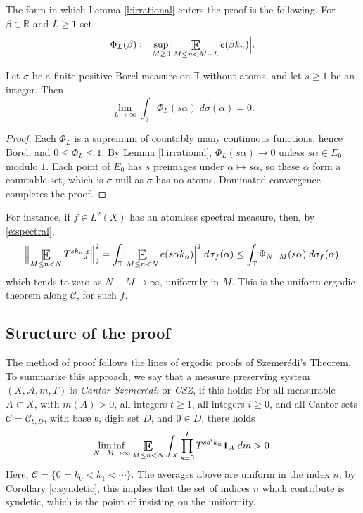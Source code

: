 The form in which Lemma \ref{l:irrational} enters the proof is the following.  For $\beta \in \mathbb R$ and $L \geq 1$ set 
\begin{equation} \label{e:Phi}
\Phi _L (\beta) \coloneqq \sup _{M\geq 0} \Bigl\lvert \Expectation_{M\leq n<M+L} e ( \beta k_n) \Bigr\rvert . 
\end{equation}

\begin{lemma} \label{l:uniformSpectral}
Let $\sigma$ be a finite positive Borel measure on $\mathbb T$ without atoms, and let $s \geq 1$ be an integer.  Then 
\begin{equation}
\lim_{L\to\infty} \int_{\mathbb T} \Phi _L (s \alpha ) \;d \sigma ( \alpha ) = 0 . 
\end{equation}
\end{lemma}

\begin{proof}
Each $\Phi_L$ is a supremum of countably many continuous functions, hence Borel, and $0 \leq \Phi _L \leq 1$.  
By Lemma \ref{l:irrational}, $\Phi_L(s \alpha ) \to 0$ unless $s \alpha \in E_0$ modulo $1$.  
Each point of $E_0$ has $s$ preimages under $\alpha \mapsto s\alpha$, so these $\alpha$ form a countable set, which is $\sigma$-null as $\sigma$ has no atoms.  
Dominated convergence completes the proof.  
\end{proof}

For instance, if $f \in L^2(X)$ has an atomless spectral measure, then, by \eqref{e:spectral}, 
\begin{equation} \label{e:Uniform}
\Bigl\lVert \Expectation _{M\leq n<N} T ^{s k_n}f \Bigr\rVert _2 ^2 
= \int_{\mathbb T} \Bigl\lvert \Expectation _{M\leq n<N} e(s\alpha k_n) \Bigr\rvert ^2 \;d \sigma _f (\alpha) 
\leq \int_{\mathbb T} \Phi _{N-M}(s \alpha )\;d \sigma _f ( \alpha ) , 
\end{equation}
which tends to zero as $N-M\to\infty$, uniformly in $M$.  This is the uniform ergodic theorem along $\mathcal C$, for such $f$.  

\subsection{Structure of the proof} 

The method of proof follows the lines of ergodic proofs of Szemer\'edi's Theorem. To summarize this approach, we say that a measure preserving system $(X,\mathcal A,m,T)$ is \emph{Cantor-Szemer\'edi},  or \emph{CSZ}, 
if this holds: 
For all measurable $A\subset X$, with $m(A) >0$, all integers $t \geq 1$, all integers $i \geq 0$, and all Cantor sets $\mathcal C = \mathcal C_{b,D}$, with base $b$, 
digit set $D$, and $0\in D$, there holds 
\begin{equation}  \label{e:CSZdef}
    \liminf_{N-M\to\infty} \Expectation_{M\leq n<N} 
    \int_X  \prod _{s=0} ^t T^{s b ^{i} k_n}\mathbf 1_A \;dm >0. 
\end{equation}
Here, $\mathcal C = \{0=k_0<k_1<\cdots\}$.  
The averages above are uniform in the index $n$; by Corollary \ref{c:syndetic}, 
this implies that the set of indices $n$ which contribute is syndetic, which is the point of insisting on the uniformity.  

